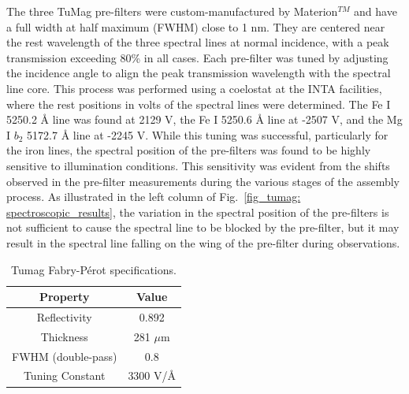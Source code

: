 The three TuMag pre-filters were custom-manufactured by Materion$^{TM}$ and have a full width at half maximum (FWHM) close to 1 nm. They are centered near the rest wavelength of the three spectral lines at normal incidence, with a peak transmission exceeding 80\% in all cases. Each pre-filter was tuned by adjusting the incidence angle to align the peak transmission wavelength with the spectral line core. This process was performed using a coelostat at the INTA facilities, where the rest positions in volts of the spectral lines were determined. The Fe I 5250.2 \r{A} line was found at 2129 V, the Fe I 5250.6 \r{A} line at -2507 V, and the Mg I $b_2$ 5172.7 \r{A} line at -2245 V. While this tuning was successful, particularly for the iron lines, the spectral position of the pre-filters was found to be highly sensitive to illumination conditions. This sensitivity was evident from the shifts observed in the pre-filter measurements during the various stages of the assembly process. As illustrated in the left column of Fig.~\ref{fig_tumag: spectroscopic_results}, the variation in the spectral position of the pre-filters is not sufficient to cause the spectral line to be blocked by the pre-filter, but it may result in the spectral line falling on the wing of the pre-filter during observations.

\begin{table}
    \centering
   \begin{tabular}{cc}
    \hline
    \hline
    Property & Value \\
    \hline
    Reflectivity & 0.892 \\
    Thickness & 281 $\mu$m\\
    FWHM (double-pass) & 0.8\\
    Tuning Constant & 3300 V/\r{A}\\
    \hline
    \hline
    \end{tabular}
    \caption{Tumag Fabry-Pérot specifications.}
    \label{table: Tumags etalon}
\end{table}

